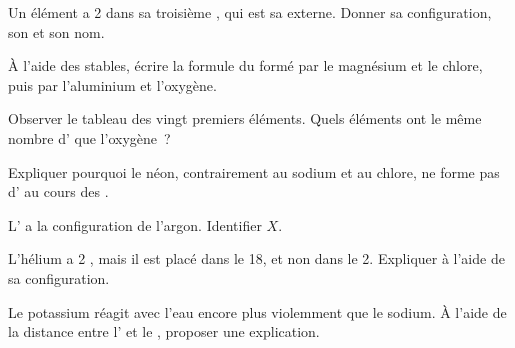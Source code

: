 \begin{exercise}[$\star\star$]\label{exo:g10:electron-shells:7}
Un élément a 2  dans sa troisième , qui est sa 
externe. Donner sa configuration, son  et son nom.
\end{exercise}

\begin{exercise}[$\star\star$]\label{exo:g10:electron-shells:8}
À l'aide des  stables, écrire la formule du  formé par
le magnésium et le chlore, puis par l'aluminium et l'oxygène.
\end{exercise}

\begin{exercise}[$\star\star$]\label{exo:g10:electron-shells:9}
Observer le tableau des vingt premiers éléments. Quels éléments ont le
même nombre d' que l'oxygène~?
\end{exercise}

\begin{exercise}[$\star\star$]\label{exo:g10:electron-shells:10}
Expliquer pourquoi le néon, contrairement au sodium et au chlore, ne
forme pas d' au cours des .
\end{exercise}

\begin{exercise}[$\star\star$]\label{exo:g10:electron-shells:11}
L'  a la configuration de l'argon. Identifier $X$.
\end{exercise}

\begin{exercise}[$\star\star\star$]\label{exo:g10:electron-shells:12}
L'hélium a 2 , mais il est placé dans le  18,
et non dans le  2. Expliquer à l'aide de sa configuration.
\end{exercise}

\begin{exercise}[$\star\star\star$]\label{exo:g10:electron-shells:13}
Le potassium réagit avec l'eau encore plus violemment que le sodium. À
l'aide de la distance entre l' et le , proposer
une explication.
\end{exercise}

